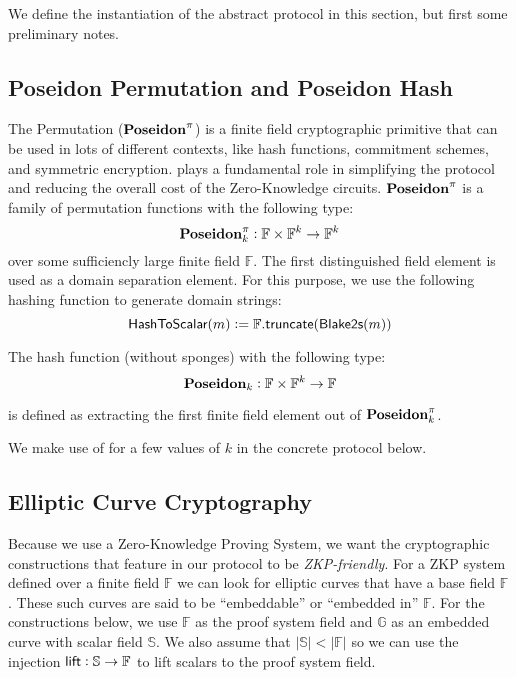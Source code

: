
We define the instantiation of the abstract protocol in this section, but first some preliminary notes.

\subsection{Poseidon Permutation and Poseidon Hash}

The \Poseidon{} Permutation (${\textbf{Poseidon}}^{\pi}$) \cite{KRRS21USENIX} is a finite field cryptographic primitive that can be used in lots of different contexts, like hash functions, commitment schemes, and symmetric encryption. \Poseidon{} plays a fundamental role in simplifying the \Transfer{} protocol and reducing the overall cost of the Zero-Knowledge circuits. ${\textbf{Poseidon}}^{\pi}$ is a family of permutation functions with the following type:
\[{\textbf{Poseidon}}^{\pi}_k : \mathbb{F} \times \mathbb{F}^k \to \mathbb{F}^k\]
over some sufficiencly large finite field $\mathbb{F}$. The first distinguished field element is used as a domain separation element. For this purpose, we use the following hashing function to generate domain strings:
\[{\textsf{HashToScalar}}(m) := \mathbb{F}.{\textsf{truncate}}(\textsf{Blake2s}(m))\]

The \Poseidon{} hash function (without sponges) with the following type:
\[{\textbf{Poseidon}}_k : \mathbb{F} \times \mathbb{F}^k \to \mathbb{F}\]

is defined as extracting the first finite field element out of ${\textbf{Poseidon}}^{\pi}_k$.
 
We make use of \Poseidon{} for a few values of $k$ in the concrete protocol below.

\subsection{Elliptic Curve Cryptography}

Because we use a Zero-Knowledge Proving System, we want the cryptographic constructions that feature in our protocol to be \emph{ZKP-friendly}. For a ZKP system defined over a finite field $\mathbb{F}$ we can look for elliptic curves that have a base field $\mathbb{F}$. These such curves are said to be ``embeddable'' or ``embedded in'' $\mathbb{F}$. For the constructions below, we use $\mathbb{F}$ as the proof system field and $\mathbb{G}$ as an embedded curve with scalar field $\mathbb{S}$. We also assume that $\left|\mathbb{S}\right| < \left|\mathbb{F}\right|$ so we can use the injection ${\textsf{lift}} : \mathbb{S} \to \mathbb{F}$ to lift scalars to the proof system field. 


